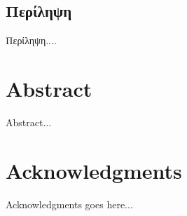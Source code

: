 \documentclass[a4paper,12pt,openright,oneside]{book}
\begin{document}
\onehalfspace



\coverpage
\copyrightpage
\clearpage
\setcounter{page}{1}
\approvalpage
\declarationpage



\begin{otherlanguage}{greek}	
\chapter*{Περίληψη}
Περίληψη....




\end{otherlanguage}
\newpage




\chapter*{Abstract}

Abstract...




\newpage




\chapter*{Acknowledgments}

Acknowledgments goes here...

\newpage



\end{document}
